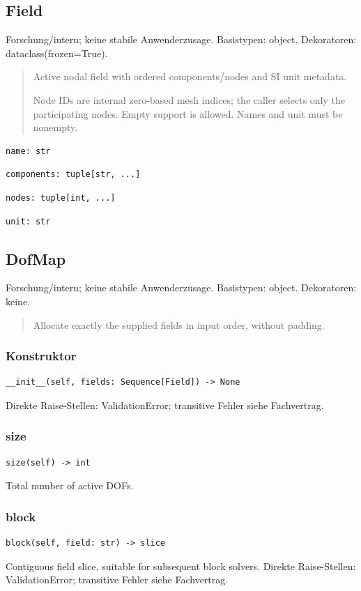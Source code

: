 \subsection{Field}
Forschung/intern; keine stabile Anwenderzusage.
Basistypen: object. Dekoratoren: dataclass(frozen=True).
\begin{quote}
Active nodal field with ordered components/nodes and SI unit metadata.\par Node IDs are internal zero-based mesh indices; the caller selects only the participating nodes. Empty support is allowed. Names and unit must be nonempty.
\end{quote}
\begin{lstlisting}
name: str
\end{lstlisting}
\begin{lstlisting}
components: tuple[str, ...]
\end{lstlisting}
\begin{lstlisting}
nodes: tuple[int, ...]
\end{lstlisting}
\begin{lstlisting}
unit: str
\end{lstlisting}
\subsection{DofMap}
Forschung/intern; keine stabile Anwenderzusage.
Basistypen: object. Dekoratoren: keine.
\begin{quote}
Allocate exactly the supplied fields in input order, without padding.
\end{quote}
\subsubsection*{Konstruktor}
\begin{lstlisting}
__init__(self, fields: Sequence[Field]) -> None
\end{lstlisting}
Direkte Raise-Stellen: ValidationError; transitive Fehler siehe Fachvertrag.
\subsubsection*{size}
\begin{lstlisting}
size(self) -> int
\end{lstlisting}
Total number of active DOFs.
\subsubsection*{block}
\begin{lstlisting}
block(self, field: str) -> slice
\end{lstlisting}
Contiguous field slice, suitable for subsequent block solvers.
Direkte Raise-Stellen: ValidationError; transitive Fehler siehe Fachvertrag.
